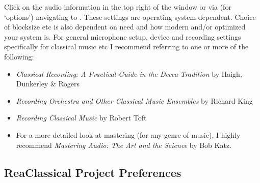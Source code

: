 \documentclass[10pt,american]{article}
\begin{document}
Click on the audio information in the top right of the window or via 
(for `options') navigating to . These settings are
operating system dependent. Choice of blocksize etc is also dependent on need
and how modern and/or optimized your system is. For general microphone setup,
device and recording settings specifically for classical music etc I recommend
referring to one or more of the following: 
\begin{itemize}
\item \emph{Classical Recording: A Practical Guide in the Decca
Tradition}\textsc{ }by Haigh, Dunkerley \& Rogers
\item \emph{Recording Orchestra and Other Classical Music Ensembles} by Richard
King
\item \emph{Recording Classical Music} by Robert Toft
\item For a more detailed look at mastering (for any genre of music), I highly
recommend \emph{Mastering Audio: The Art and the Science} by Bob Katz. 
\end{itemize}

\subsection{ReaClassical Project Preferences}
\end{document}
